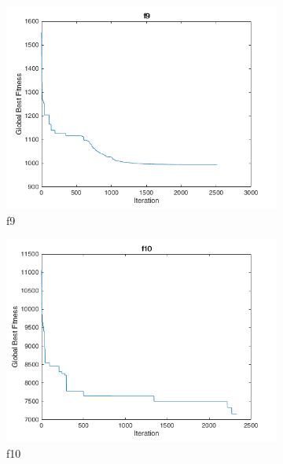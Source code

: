 \begin{figure}
  \centering
  \begin{subfigure}[b]{0.4\textwidth}
    \includegraphics[width=\textwidth]{img/cecrt/f9}
    \caption{f9}
  \end{subfigure}
  \begin{subfigure}[b]{0.4\textwidth}
    \includegraphics[width=\textwidth]{img/cecrt/f10}
    \caption{f10}
  \end{subfigure}
  \begin{subfigure}[b]{0.4\textwidth}

\end{subfigure}
\end{figure}
